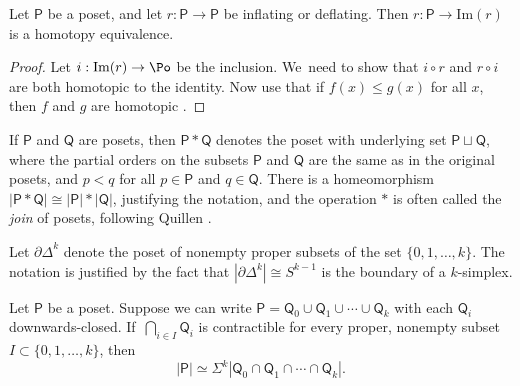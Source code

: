 \begin{lem}\label{monotone}Let $\mathsf P$ be a poset, and let $r\colon\mathsf P\to \mathsf P$ be inflating or deflating. Then $r\colon\mathsf P\to \mathrm{Im}(r)$ is a homotopy equivalence.
\end{lem}

\begin{proof}Let $i:\mathrm{Im}(r) \to \Po$ be the inclusion. We~need to show that $i \circ r$ and $r \circ i$ are both homotopic to the identity.
Now use that if $f(x) \leq g(x)$ for all $x$, then $f$ and $g$ are homotopic \cite[\S1.3]{quillen-homotopyproperties}.
\end{proof}

\begin{notation}\label{notation:quillenjoin}
If $\mathsf P$ and $\mathsf Q$ are posets, then $\mathsf P \ast \mathsf Q$ denotes the poset with underlying set $\mathsf P \sqcup\mathsf Q$, where the partial orders on the subsets $\mathsf P$ and $\mathsf Q$ are the same as in the original posets, and $p < q$ for all $p \in \mathsf P$ and $q \in \mathsf Q$. There is a homeomorphism $|\mathsf P \ast\mathsf Q| \cong |\mathsf P| \ast |\mathsf Q|$, justifying the notation, and the operation $\ast$ is often called the \emph{join} of posets, following Quillen \cite[p.\,104]{quillen-homotopyproperties}.
\end{notation}

\begin{notation}
Let ${\partial\mathsf\Delta}^k$ denote the poset of nonempty proper subsets of the set $\{0,1,\dots,k\}$. The notation is justified by the fact that $|\partial\mathsf\Delta^k| \cong S^{k-1}$ is the boundary of a $k$-simplex.
\end{notation}

\begin{lem}\label{hocolim2}
Let $\mathsf P$ be a poset. Suppose we can write $\mathsf P = \mathsf Q_0 \cup \mathsf Q_1 \cup \cdots \cup \mathsf Q_k$ with each $\mathsf Q_i$ downwards-closed. If~$\bigcap_{i \in I}\mathsf Q_i$ is contractible for every proper, nonempty subset $I \subset \{0, 1,\ldots, k\}$, then\[
|\mathsf P| \simeq \Sigma^{k} |\mathsf Q_0 \cap \mathsf Q_1\cap \cdots \cap \mathsf Q_k|.
\]
\end{lem}


